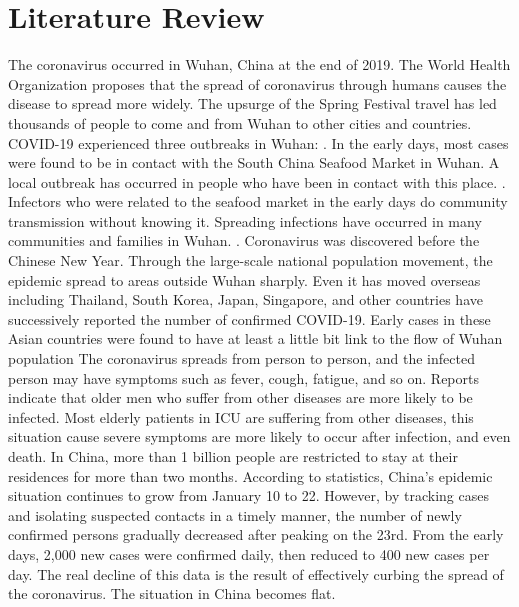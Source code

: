 \documentclass[12pt,english]{article}
\begin{document}
\section{Literature Review}
The coronavirus occurred in Wuhan, China at the end of 2019. The World Health Organization proposes that the spread of coronavirus through humans causes the disease to spread more widely. 
\cite{zhu2020novel}
The upsurge of the Spring Festival travel has led thousands of people to come and from Wuhan to other cities and countries.
\cite{fawad2020updated}
\newline
COVID-19 experienced three outbreaks in Wuhan: 
. In the early days, most cases were found to be in contact with the South China Seafood Market in Wuhan. A local outbreak has occurred in people who have been in contact with this place. 
. Infectors who were related to the seafood market in the early days do community transmission without knowing it. Spreading infections have occurred in many communities and families in Wuhan. 
. Coronavirus was discovered before the Chinese New Year. Through the large-scale national population movement, the epidemic spread to areas outside Wuhan sharply. Even it has moved overseas including Thailand, South Korea, Japan, Singapore, and other countries have successively reported the number of confirmed COVID-19. Early cases in these Asian countries were found to have at least a little bit link to the flow of Wuhan population
\cite{world2020coronavirus}
\newline
The coronavirus spreads from person to person, and the infected person may have symptoms such as fever, cough, fatigue, and so on. Reports indicate that older men who suffer from other diseases are more likely to be infected. 
\cite{singhal2020review}
Most  elderly  patients in ICU are suffering from other diseases, this situation cause severe symptoms are more likely to occur after infection, and even death.
\cite{fawad2020updated}
\newline
In China, more than 1 billion people are restricted to stay at their residences for more than two months. According to statistics, China's epidemic situation continues to grow from January 10 to 22. However, by tracking cases and isolating suspected contacts in a timely manner, the number of newly confirmed persons gradually decreased after peaking on the 23rd. From the early days, 2,000 new cases were confirmed daily, then reduced to 400 new cases per day. The real decline of this data is the result of effectively curbing the spread of the coronavirus. The situation in China becomes flat.
\end{document}
